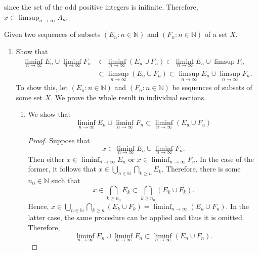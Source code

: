 \documentclass[12pt]{article}
\newcommand{\N}{\mathbb{N}}
\newenvironment{problem}[2][Problem]{\begin{trivlist}
		\item[\hskip \labelsep {\bfseries #1}\hskip \labelsep {\bfseries #2.}]}{\end{trivlist}}
\begin{document}
since the set of the odd positive integers is inifinite. Therefore, $x\in \limsup_{n\to \infty} A_{n}$.\\
	\begin{problem}{1}
		Given two sequences of subsets $\left(E_{n}:n\in \N\right)$ and $\left(F_{n}: n\in \N\right)$ of a set $X$.
		
		\begin{enumerate}[label=(\alph*)]
			\item Show that
			\begin{align*}
				\liminf_{n\to \infty} E_{n} \cup \liminf_{n\to \infty}F_{n} &\subset \liminf_{n\to \infty}\left(E_{u}\cup F_{u}\right) \subset \liminf_{n\to \infty} E_{u} \cup \limsup F_{n} \\
				&\subset \limsup_{n\to \infty}\left(E_{n}\cup F_{n}\right) \subset \limsup_{n\to \infty}E_{n}\cup \limsup_{n\to \infty} F_{n}.
			\end{align*}
		To show this, let $\left(E_{n}:n\in \N\right)$ and $\left(F_{n}: n\in \N\right)$ be sequences of subsets of some set $X$. We prove the whole result in individual sections.
			\begin{enumerate}[label=\textbf{\arabic*.}]
				\item We show that 
				\begin{equation*}
					\liminf_{n\to \infty} E_{n} \cup \liminf_{n\to \infty}F_{n} \subset \liminf_{n\to \infty}\left(E_{u}\cup F_{u}\right)
				\end{equation*}
			\begin{proof}
			 Suppose that 
				\begin{equation*}
				x\in \liminf_{n\to \infty} E_{n} \cup \liminf_{n\to \infty}F_{n}.
			     \end{equation*}
		     Then either $x\in \liminf_{n\to \infty} E_{n}$ or $x\in \liminf_{n\to \infty} F_{n}$. In the case of the former, it follows that $x\in \bigcup_{n\in \N}\bigcap_{k\geq n}E_{k}$. Therefore, there is some $n_{0}\in \N$ such that 
		     \begin{equation*}
		     x \in \bigcap_{k\geq n_{0}} E_{k} \subset \bigcap_{k\geq n_{0}} \left(E_{k}\cup F_{k}\right). 		      	
	         \end{equation*}
         	Hence, $x\in \bigcup_{n\in \N} \bigcap_{k\geq n} (E_{k} \cup F_{k}) = \liminf_{n\to \infty}\left(E_{u}\cup F_{u}\right)$. In the latter case, the same procedure can be applied and thus it is omitted. Therefore, 
         	\begin{equation*}
         		\liminf_{n\to \infty} E_{n} \cup \liminf_{n\to \infty}F_{n} \subset \liminf_{n\to \infty}\left(E_{n}\cup F_{n}\right).
         	\end{equation*}
        \end{proof}
         

\end{enumerate}
\end{enumerate}
\end{problem}
\end{document}
